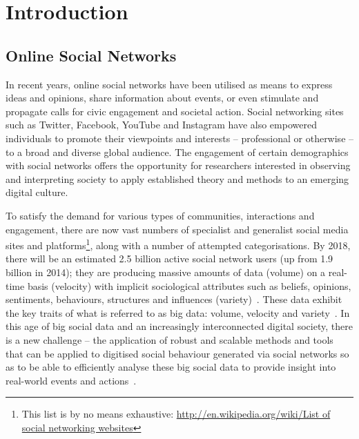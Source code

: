 \section{Introduction}\label{intro}

\subsection{Online Social Networks}
 
In recent years, online social networks have been utilised as
means to express ideas and opinions, share information about events,
or even stimulate and propagate calls for civic engagement and
societal action. Social networking sites such as Twitter, Facebook,
YouTube and Instagram have also empowered individuals to promote their
viewpoints and interests -- professional or otherwise -- to a broad
and diverse global audience. The engagement of certain demographics
with social networks offers the opportunity for researchers interested
in observing and interpreting society to apply established theory and
methods to an emerging digital culture.

To satisfy the demand for various types of communities, interactions
and engagement, there are now vast numbers of specialist and
generalist social media sites and platforms\footnote{This list is by
no means exhaustive: \url{http://en.wikipedia.org/wiki/List of social
networking websites}}, along with a number of attempted
categorisations. By 2018, there will be an estimated 2.5 billion
active social network users (up from 1.9 billion in 2014); they are
producing massive amounts of data (volume) on a real-time basis
(velocity) with implicit sociological attributes such as beliefs,
opinions, sentiments, behaviours, structures and influences
(variety)~\cite{burnap-et-al:2015}. These data exhibit the key traits
of what is referred to as big data: volume, velocity and
variety~\cite{postsm:2014}. In this age of big social data and an
increasingly interconnected digital society, there is a new challenge
-- the application of robust and scalable methods and tools that can
be applied to digitised social behaviour generated via social networks
so as to be able to efficiently analyse these big social data to
provide insight into real-world events and
actions~\cite{lazer-et-al:2009,burnap-et-al:2015}.

